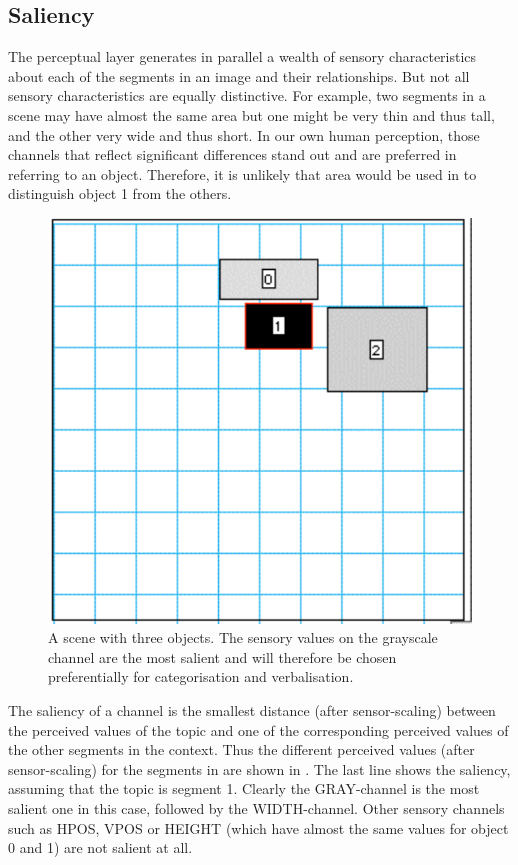\subsection{Saliency}

The perceptual layer generates in parallel a wealth of 
sensory characteristics about each of the segments in 
an image and their relationships. But not all sensory 
characteristics are equally distinctive. For example, two 
segments in a scene may have almost the same area but 
one might be very thin and thus tall, and the other very wide
and thus short. In our own human perception, those channels
that reflect significant differences stand out and are preferred
in referring to an object. Therefore, it is unlikely that area would be 
used in  to distinguish object 1 from 
the others. 

\begin{figure}[htbp]
  \centerline{\includegraphics[width=.45\textwidth]{chap3/figs/recscene}}
\caption{ \label{rect1b} A scene with three objects. The
sensory values on the grayscale channel are the most salient 
and will therefore be chosen preferentially for categorisation
and verbalisation.}
\end{figure}

The saliency of a channel 
is the smallest distance (after sensor-scaling) between the perceived
values of the topic and one of the corresponding perceived values of the 
other segments in the context. 
Thus the different perceived values (after sensor-scaling)
for the segments in  are shown in 
. The last line shows the saliency, assuming that 
the topic is segment 1.  Clearly the GRAY-channel is the most salient
one in this case, followed by the WIDTH-channel. Other 
sensory channels such as HPOS, VPOS or HEIGHT (which have almost the same 
values for object 0 and 1) are not salient at all. 


